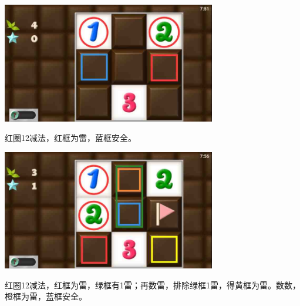 \subsection{} %
\begin{center}
    \includegraphics[width=0.7\textwidth]{puzzlelow/11-1.jpg}
\end{center}
红圈12减法，红框为雷，蓝框安全。
\begin{center}
    \includegraphics[width=0.7\textwidth]{puzzlelow/11-2.jpg}
\end{center}
红圈12减法，红框为雷，绿框有1雷；再数雷，排除绿框1雷，得黄框为雷。数数，橙框为雷，蓝框安全。

